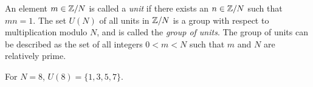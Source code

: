 An element $m\in \mathbb{Z}/N$ is called a {\it unit} if
there exists an $n\in \mathbb{Z}/N$ such that $mn = 1$.  The set
$U(N)$ of all units in $\mathbb{Z}/N$ is a group with respect to
multiplication modulo $N$, and is called the 
\emph{group of units}.%
The group of units can be described %
as the set of all integers $0<m<N$ such that $m$ and $N$ are
relatively prime.  
\begin{example}
For $N=8$, $U(8) = \{1, 3, 5, 7\}$.
\end{example}

